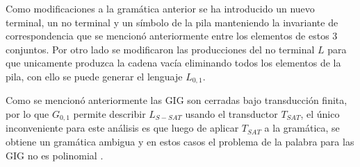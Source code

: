 Como modificaciones a la gramática anterior se ha introducido un nuevo terminal, un no terminal y un símbolo de la pila manteniendo la invariante de correspondencia que se mencionó anteriormente entre los elementos de estos 3 conjuntos. Por otro lado se modificaron las producciones del no terminal $L$ para que unicamente produzca la cadena vacía eliminando todos los elementos de la pila, con ello se puede generar el lenguaje $L_{0,1}$.


Como se mencionó anteriormente las GIG son cerradas bajo transducción finita, por lo que $G_{0,1}$ permite describir $L_{S-SAT}$ usando el transductor $T_{SAT}$, el único inconveniente para este análisis es que luego de aplicar $T_{SAT}$ a la gramática, se obtiene un gramática ambigua y en estos casos el problema de la palabra para las GIG no es polinomial \cite{globalIndexLanguages}.
